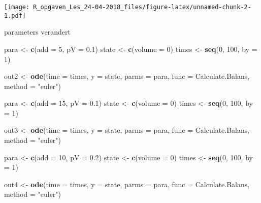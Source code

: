 \documentclass[]{article}
\newenvironment{Shaded}{\begin{snugshade}}{\end{snugshade}}
\newcommand{\KeywordTok}[1]{\textcolor[rgb]{0.13,0.29,0.53}{\textbf{#1}}}
\newcommand{\DataTypeTok}[1]{\textcolor[rgb]{0.13,0.29,0.53}{#1}}
\newcommand{\DecValTok}[1]{\textcolor[rgb]{0.00,0.00,0.81}{#1}}
\newcommand{\FloatTok}[1]{\textcolor[rgb]{0.00,0.00,0.81}{#1}}
\newcommand{\StringTok}[1]{\textcolor[rgb]{0.31,0.60,0.02}{#1}}
\newcommand{\NormalTok}[1]{#1}
\begin{document}
\texttt{[image: R\_opgaven\_Les\_24-04-2018\_files/figure-latex/unnamed-chunk-2-1.pdf]}

parameters verandert

\begin{Shaded}
\begin{Highlighting}[]
\NormalTok{para <-}\StringTok{ }\KeywordTok{c}\NormalTok{(}\DataTypeTok{add =} \DecValTok{5}\NormalTok{, }\DataTypeTok{pV =} \FloatTok{0.1}\NormalTok{)}
\NormalTok{state <-}\StringTok{ }\KeywordTok{c}\NormalTok{(}\DataTypeTok{volume =} \DecValTok{0}\NormalTok{)}
\NormalTok{times <-}\StringTok{ }\KeywordTok{seq}\NormalTok{(}\DecValTok{0}\NormalTok{, }\DecValTok{100}\NormalTok{,  }\DataTypeTok{by =} \DecValTok{1}\NormalTok{)}

\NormalTok{out2 <-}\StringTok{ }\KeywordTok{ode}\NormalTok{(}\DataTypeTok{time =}\NormalTok{ times,}
           \DataTypeTok{y =}\NormalTok{ state,}
           \DataTypeTok{parms =}\NormalTok{ para,}
           \DataTypeTok{func =}\NormalTok{ Calculate.Balans,}
           \DataTypeTok{method =} \StringTok{"euler"}\NormalTok{)}

\NormalTok{para <-}\StringTok{ }\KeywordTok{c}\NormalTok{(}\DataTypeTok{add =} \DecValTok{15}\NormalTok{, }\DataTypeTok{pV =} \FloatTok{0.1}\NormalTok{)}
\NormalTok{state <-}\StringTok{ }\KeywordTok{c}\NormalTok{(}\DataTypeTok{volume =} \DecValTok{0}\NormalTok{)}
\NormalTok{times <-}\StringTok{ }\KeywordTok{seq}\NormalTok{(}\DecValTok{0}\NormalTok{, }\DecValTok{100}\NormalTok{,  }\DataTypeTok{by =} \DecValTok{1}\NormalTok{)}

\NormalTok{out3 <-}\StringTok{ }\KeywordTok{ode}\NormalTok{(}\DataTypeTok{time =}\NormalTok{ times,}
           \DataTypeTok{y =}\NormalTok{ state,}
           \DataTypeTok{parms =}\NormalTok{ para,}
           \DataTypeTok{func =}\NormalTok{ Calculate.Balans,}
           \DataTypeTok{method =} \StringTok{"euler"}\NormalTok{)}

\NormalTok{para <-}\StringTok{ }\KeywordTok{c}\NormalTok{(}\DataTypeTok{add =} \DecValTok{10}\NormalTok{, }\DataTypeTok{pV =} \FloatTok{0.2}\NormalTok{)}
\NormalTok{state <-}\StringTok{ }\KeywordTok{c}\NormalTok{(}\DataTypeTok{volume =} \DecValTok{0}\NormalTok{)}
\NormalTok{times <-}\StringTok{ }\KeywordTok{seq}\NormalTok{(}\DecValTok{0}\NormalTok{, }\DecValTok{100}\NormalTok{,  }\DataTypeTok{by =} \DecValTok{1}\NormalTok{)}

\NormalTok{out4 <-}\StringTok{ }\KeywordTok{ode}\NormalTok{(}\DataTypeTok{time =}\NormalTok{ times,}
           \DataTypeTok{y =}\NormalTok{ state,}
           \DataTypeTok{parms =}\NormalTok{ para,}
           \DataTypeTok{func =}\NormalTok{ Calculate.Balans,}
           \DataTypeTok{method =} \StringTok{"euler"}\NormalTok{)}


\end{Highlighting}
\end{Shaded}
\end{document}

